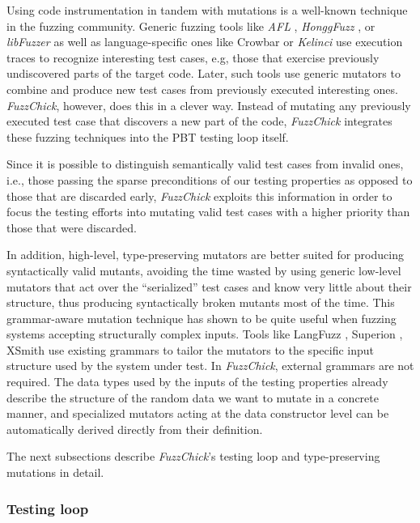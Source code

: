 \documentclass[sigconf, anonymous]{acmart}
\newcommand{\fuzzchick}{\textit{FuzzChick}\xspace}
\begin{document}
Using code instrumentation in tandem with mutations is a well-known technique in
the fuzzing community.
%
Generic fuzzing tools like \emph{AFL} \cite{afl}, \emph{HonggFuzz}
\cite{honggfuzz}, or \emph{libFuzzer} \citeyearpar{libfuzzer} as well as
language-specific ones like Crowbar \cite{dolan2017testing} or \emph{Kelinci}
\cite{kersten2017poster} use execution traces to recognize interesting test
cases, e.g, those that exercise previously undiscovered parts of the target
code.
%
Later, such tools use generic mutators to combine and produce new test cases
from previously executed interesting ones.
%
\fuzzchick, however, does this in a clever way.
%
Instead of mutating any previously executed test case that discovers a new part
of the code, \fuzzchick integrates these fuzzing techniques into the PBT testing
loop itself.


Since it is possible to distinguish semantically valid test cases from invalid
ones, i.e., those passing the sparse preconditions of our testing properties as
opposed to those that are discarded early, \fuzzchick exploits this information
in order to focus the testing efforts into mutating valid test cases with a
higher priority than those that were discarded.


In addition, high-level, type-preserving mutators are better suited for
producing syntactically valid mutants, avoiding the time wasted by using generic
low-level mutators that act over the ``serialized'' test cases and know very
little about their structure, thus producing syntactically broken mutants most
of the time.
%
This grammar-aware mutation technique has shown to be quite useful when fuzzing
systems accepting structurally complex inputs.
%
Tools like LangFuzz \cite{holler2012fuzzing}, Superion \cite{wang2019superion},
XSmith \cite{xsmith} use existing grammars to tailor the mutators to the
specific input structure used by the system under test.
%
In \fuzzchick, external grammars are not required.
%
The data types used by the inputs of the testing properties already describe the
structure of the random data we want to mutate in a concrete manner, and
specialized mutators acting at the data constructor level can be automatically
derived directly from their definition.

The next subsections describe \fuzzchick's testing loop and type-preserving
mutations in detail.

\subsubsection{Testing loop}
\end{document}
